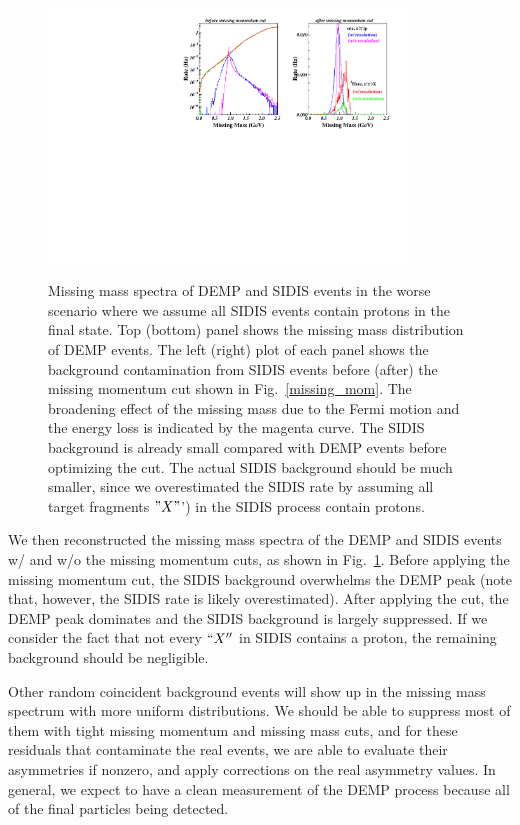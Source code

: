 \begin{figure}[!ht]
 \begin{center}
      \includegraphics[type=pdf,
        ext=.pdf,read=.pdf,width=0.85\textwidth]
{./figures/Missing_Mass_Fermi_Rad_023Hz} \\
   \caption[Missing Mass]{\footnotesize{Missing mass spectra of DEMP and SIDIS
events in the worse scenario where we assume all SIDIS events contain protons in the final state. 
Top (bottom) panel shows the missing mass distribution of DEMP events.
The left (right) plot of each panel shows the background contamination from
SIDIS events before (after) the missing momentum cut shown in
Fig.~\ref{missing_mom}. The broadening effect of the missing mass due to the
Fermi motion and the energy loss is indicated by the magenta curve. The SIDIS
background is already small compared with DEMP events before optimizing the
cut. The actual SIDIS background should be much smaller, since we overestimated
the SIDIS rate by assuming all target fragments $"X"$') in the SIDIS process
contain protons.}}
  \label{missing_mass}
  \end{center}
\end{figure}

We then reconstructed the missing mass spectra of the DEMP and SIDIS events w/
and w/o the missing momentum cuts, as shown in Fig.~\ref{missing_mass}. Before
applying the missing momentum cut, the SIDIS background overwhelms the DEMP
peak (note that, however, the SIDIS rate is likely overestimated). After
applying the cut, the DEMP peak dominates and the SIDIS background is largely
suppressed. If we consider the fact that not every $``X''$ in SIDIS contains a
proton, the remaining background should be negligible.

Other random coincident background events will show up in the missing mass
spectrum with more uniform distributions. We should be able to suppress most of
them with tight missing momentum and missing mass cuts, and for these residuals
that contaminate the real events, we are able to evaluate their asymmetries if
nonzero, and apply corrections on the real asymmetry values. In general, we
expect to have a clean measurement of the DEMP process because all of the final
particles being detected.

